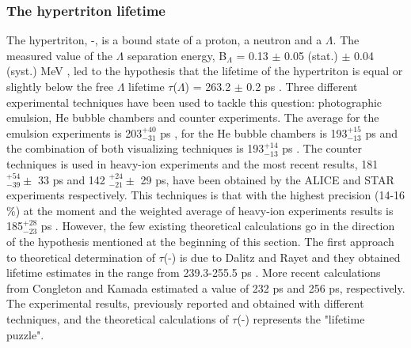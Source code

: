 \subsubsection{The hypertriton lifetime}
The hypertriton, \hyp, is a bound state of a proton, a neutron and a $\Lambda$.
The measured value of the $\Lambda$ separation energy, B$_{\Lambda}$ = 0.13 $\pm$ 0.05 (stat.) $\pm$ 0.04 (syst.) MeV \cite{davis20053}, led to the hypothesis that the lifetime of the hypertriton is equal or slightly below the free $\Lambda$ lifetime $\tau$($\Lambda$) = 263.2 $\pm$ 0.2 ps \cite{pdg:2017}.
Three different experimental techniques have been used to tackle this question: photographic emulsion, He bubble chambers and counter experiments. The average for the emulsion experiments is 203$^{+40}_{-31}$ ps \cite{agnello:2016}, for the He bubble chambers is 193$^{+15}_{-13}$ ps \cite{agnello:2016} and the combination of both visualizing techniques is 193$^{+14}_{-13}$ ps \cite{agnello:2016}. The counter techniques is used in heavy-ion experiments and the most recent results, 181 $^{+54}_{-39} \pm$ 33 ps and 142 $^{+24}_{-21} \pm$ 29 ps, have been obtained by the ALICE \cite{PhysLettB.754.360} and STAR \cite{PhysRevC.97.054909} experiments respectively. This techniques is that with the highest precision (14-16$\%$) at the moment and the weighted average of heavy-ion experiments results is 185$^{+28}_{-23}$ ps \cite{agnello:2016}.
However, the few existing theoretical calculations go in the direction of the hypothesis mentioned at the beginning of this section. The first approach to theoretical determination of $\tau$(\hyp) is due to Dalitz and Rayet and they obtained lifetime estimates in the range from 239.3-255.5 ps \cite{NuovCim.A46}. More recent calculations from Congleton \cite{jphysg.18.339} and Kamada \cite{Phys.Rev.C57} estimated a value of 232 ps and 256 ps, respectively.
The experimental results, previously reported and obtained with different techniques, and the theoretical calculations of $\tau$(\hyp) represents the "lifetime puzzle".

